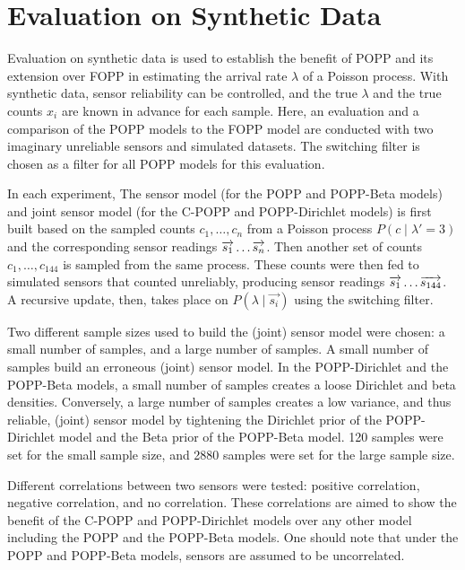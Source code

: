 \section{Evaluation on Synthetic Data}
\label{sec:evasim}

Evaluation on synthetic data is used to establish the benefit of POPP and its extension over FOPP in estimating the arrival rate $\lambda$ of a Poisson process. With synthetic data, sensor reliability can be controlled, and the true $\lambda$ and the true counts $x_i$ are known in advance for each sample. Here, an evaluation and a comparison of the POPP models to the FOPP model are conducted with two imaginary unreliable sensors and simulated datasets. The switching filter is chosen as a filter for all POPP models for this evaluation.

In each experiment, The sensor model (for the POPP and POPP-Beta models) and joint sensor model (for the C-POPP and POPP-Dirichlet models) is first built based on the sampled counts $c_1, \ldots, c_n$ from a Poisson process $P(c \mid \lambda'=3)$ and the corresponding sensor readings $\protect\overrightarrow{s_1} \ldots \protect\overrightarrow{s_{n}}$. Then another set of counts $c_1, \ldots, c_{144}$ is sampled from the same process. These counts were then fed to simulated sensors that counted unreliably, producing sensor readings $\protect\overrightarrow{s_1} \ldots \protect\overrightarrow{s_{144}}$. A recursive update, then, takes place on $P(\lambda \mid \overrightarrow{s_i})$ using the switching filter.

Two different sample sizes used to build the (joint) sensor model were chosen: a small number of samples, and a large number of samples. A small number of samples build an erroneous (joint) sensor model. In the POPP-Dirichlet and the POPP-Beta models, a small number of samples creates a loose Dirichlet and beta densities. Conversely, a large number of samples creates a low variance, and thus reliable, (joint) sensor model by tightening the Dirichlet prior of the POPP-Dirichlet model and the Beta prior of the POPP-Beta model. 120 samples were set for the small sample size, and 2880 samples were set for the large sample size.

Different correlations between two sensors were tested: positive correlation, negative correlation, and no correlation. These correlations are aimed to show the benefit of the C-POPP and POPP-Dirichlet models over any other model including the POPP and the POPP-Beta models. One should note that under the POPP and POPP-Beta models, sensors are assumed to be uncorrelated.  

